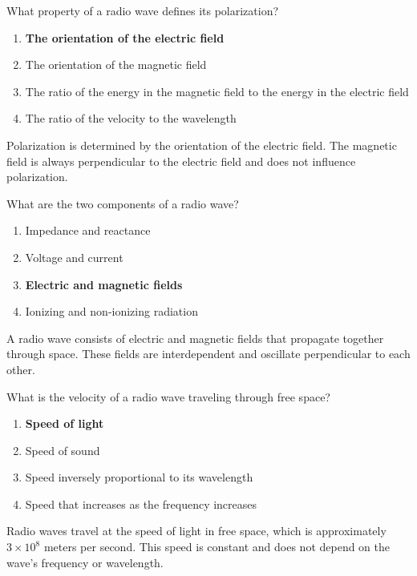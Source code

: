 \begin{tcolorbox}[colback=gray!10!white,colframe=black!75!black,title={T3B02}]
    What property of a radio wave defines its polarization?
    \begin{enumerate}[label=\Alph*),noitemsep]
        \item \textbf{The orientation of the electric field}
        \item The orientation of the magnetic field
        \item The ratio of the energy in the magnetic field to the energy in the electric field
        \item The ratio of the velocity to the wavelength
    \end{enumerate}
\end{tcolorbox}
Polarization is determined by the orientation of the electric field. The magnetic field is always perpendicular to the electric field and does not influence polarization.


\begin{tcolorbox}[colback=gray!10!white,colframe=black!75!black,title={T3B03}]
    What are the two components of a radio wave?
    \begin{enumerate}[label=\Alph*),noitemsep]
        \item Impedance and reactance
        \item Voltage and current
        \item \textbf{Electric and magnetic fields}
        \item Ionizing and non-ionizing radiation
    \end{enumerate}
\end{tcolorbox}
A radio wave consists of electric and magnetic fields that propagate together through space. These fields are interdependent and oscillate perpendicular to each other.


\begin{tcolorbox}[colback=gray!10!white,colframe=black!75!black,title={T3B04}]
    What is the velocity of a radio wave traveling through free space?
    \begin{enumerate}[label=\Alph*),noitemsep]
        \item \textbf{Speed of light}
        \item Speed of sound
        \item Speed inversely proportional to its wavelength
        \item Speed that increases as the frequency increases
    \end{enumerate}
\end{tcolorbox}
Radio waves travel at the speed of light in free space, which is approximately $3 \times 10^8$ meters per second. This speed is constant and does not depend on the wave's frequency or wavelength.

